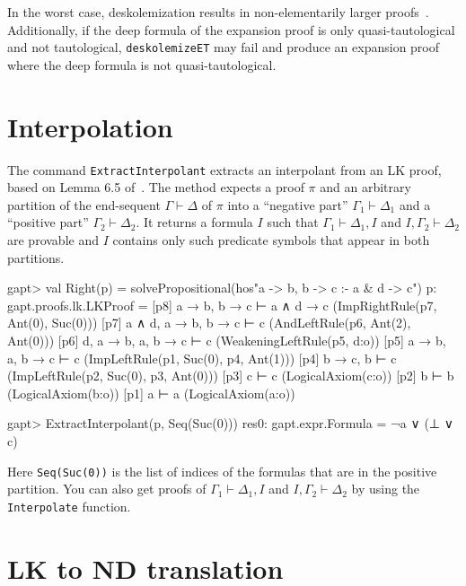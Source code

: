 \documentclass[a4paper,11pt]{book}
\newcommand{\seq}{\vdash}	%
\begin{document}
In the worst case, deskolemization results in non-elementarily larger
proofs~\cite{Aguilera2016Unsound}.  Additionally, if the deep formula of the
expansion proof is only quasi-tautological and not tautological,
\texttt{deskolemizeET} may fail and produce an expansion proof where the deep
formula is not quasi-tautological.

\section{Interpolation}

The command \texttt{ExtractInterpolant} extracts an interpolant from an LK
proof, based on Lemma 6.5 of~\cite{Takeuti87Proof}.  The method expects a proof
$\pi$ and an arbitrary partition of the end-sequent $\Gamma \seq \Delta$ of
$\pi$ into a ``negative part'' $\Gamma_1\seq\Delta_1$ and a ``positive part''
$\Gamma_2 \seq \Delta_2$.  It returns a formula $I$ such that
$\Gamma_1\seq\Delta_1, I$ and $I,\Gamma_2\seq\Delta_2$ are provable and $I$
contains only such predicate symbols that appear in both partitions.

\begin{clilisting}
gapt> val Right(p) = solvePropositional(hos"a -> b, b -> c :- a & d -> c")
p: gapt.proofs.lk.LKProof =
[p8] a → b, b → c ⊢ a ∧ d → c    (ImpRightRule(p7, Ant(0), Suc(0)))
[p7] a ∧ d, a → b, b → c ⊢ c    (AndLeftRule(p6, Ant(2), Ant(0)))
[p6] d, a → b, a, b → c ⊢ c    (WeakeningLeftRule(p5, d:o))
[p5] a → b, a, b → c ⊢ c    (ImpLeftRule(p1, Suc(0), p4, Ant(1)))
[p4] b → c, b ⊢ c    (ImpLeftRule(p2, Suc(0), p3, Ant(0)))
[p3] c ⊢ c    (LogicalAxiom(c:o))
[p2] b ⊢ b    (LogicalAxiom(b:o))
[p1] a ⊢ a    (LogicalAxiom(a:o))

gapt> ExtractInterpolant(p, Seq(Suc(0)))
res0: gapt.expr.Formula = ¬a ∨ (⊥ ∨ c)

\end{clilisting}

Here \texttt{Seq(Suc(0))} is the list of indices of the formulas that are in
the positive partition.  You can also get proofs of $\Gamma_1 \vdash \Delta_1,
I$ and $I, \Gamma_2 \vdash \Delta_2$ by using the \texttt{Interpolate}
function.

\section{LK to ND translation}
\end{document}
